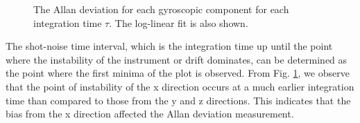 \documentclass[a4paper]{report}
\numberwithin{equation}{section}
\begin{document}
\begin{figure}[hbt!]
	\centering
	\quad
	\quad

	\caption{The Allan deviation for each gyroscopic component for each integration time $\tau$. The log-linear fit is 
	also shown.}
	\label{fig:prelab_allan}
\end{figure}


The shot-noise time interval, which is the integration time up until the point where the instability of the instrument or drift dominates, 
can be determined as the point where the first minima of the plot is observed. From Fig. \ref{fig:prelab_allan}, we observe that the
point of instability of the x direction occurs at a much earlier integration time than compared to those from the y and z directions. 
This indicates that the bias from the x direction affected the Allan deviation measurement. \par 
\end{document}
